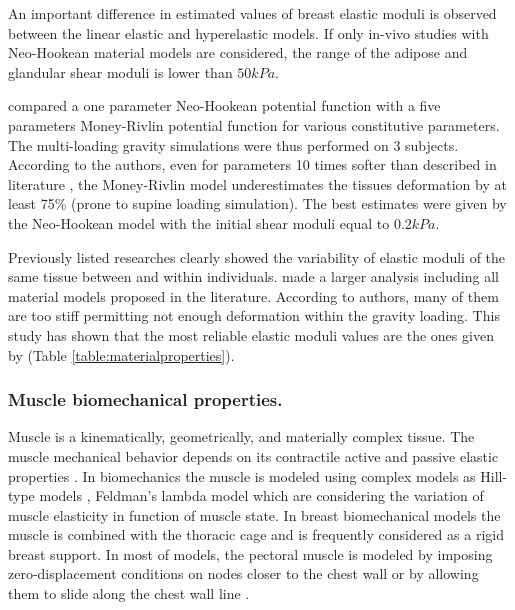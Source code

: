 An important difference in estimated values of breast elastic moduli is observed between the linear elastic and hyperelastic models. If only in-vivo studies with Neo-Hookean material models are considered, the range of the adipose and glandular shear moduli is lower than $50kPa$. 

\cite{carter_biomechanical_2009} compared a one parameter Neo-Hookean potential function with a five parameters Money-Rivlin potential function for various constitutive parameters. The multi-loading gravity simulations were thus performed on 3 subjects. According to the authors, even for parameters 10 times softer than described in literature \citep{abbas_biomechanical_2001}, the Money-Rivlin model underestimates the tissues deformation by at least 75\% (prone to supine loading simulation). The best estimates were given by the Neo-Hookean model with the initial shear moduli equal to $0.2kPa$.  

Previously listed researches clearly showed the variability of elastic moduli of the same tissue between and within individuals. \cite{eder_comparison_2014} made a larger analysis including all material models proposed in the literature. According to authors, many of them are too stiff permitting not enough deformation within the gravity loading. This study has shown that the most reliable elastic moduli values are the ones given by \cite{rajagopal_creating_2008} (Table \ref{table:materialproperties}).

\subsubsection*{Muscle biomechanical properties.} 
Muscle is a kinematically, geometrically, and materially complex tissue. The muscle mechanical behavior depends on its contractile active and passive elastic properties \citep{nordez_muscle_2010}. In biomechanics the muscle is modeled using complex models as Hill-type models
\citep{zajac_muscle_1989}, Feldman’s lambda model \citep{feldman_once_1986} which are considering the variation of muscle elasticity in function of muscle state. In breast biomechanical models the muscle is combined with the thoracic cage and is frequently considered as a rigid breast support. In most of models, the pectoral muscle is modeled by imposing zero-displacement conditions on nodes closer to the chest wall \citep{abbas_biomechanical_2001,chung_modelling_2008,rajagopal_mapping_2010}  
or by allowing them to slide along the chest wall line \citep{han_nonlinear_2014,georgii_simulation_2016}.   

